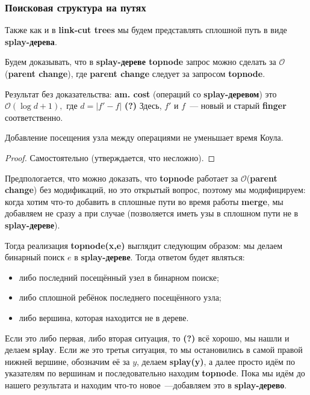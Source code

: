 \subsubsection{Поисковая структура на путях}
Также как и в \textbf{link-cut trees} мы будем представлять сплошной путь в виде \textbf{splay-дерева}.

Будем доказывать, что в \textbf{splay-дереве topnode} запрос можно сделать за $\mathcal{O}$(\textbf{parent change}), где \textbf{parent change} следует за запросом \textbf{topnode}.


Результат без доказательства: \textbf{am. cost} (операций со \textbf{splay-деревом}) это $\mathcal{O}(\log{d + 1}),$ где $d = |f' - f|$ \textbf{(?)} Здесь, $f'$ и $f$~--- новый и старый \textbf{finger} соответственно.
\begin{lemma}
Добавление посещения узла между операциями не уменьшает время Коула.
\end{lemma}
\begin{proof}
Самостоятельно (утверждается, что несложно).
\end{proof}

Предпологается, что можно доказать, что \textbf{topnode} работает за $\mathcal{O}$(\textbf{parent change}) без модификаций, но это открытый вопрос, поэтому мы модифицируем: когда хотим что-то добавить в сплошные пути во время работы \textbf{merge}, мы добавляем не сразу а при случае (позволяется иметь узы в сплошном пути не в \textbf{splay-дереве}).

Тогда реализация \textbf{topnode(x,e)} выглядит следующим образом: мы делаем бинарный поиск $e$ в \textbf{splay-дереве}. Тогда ответом будет являться:
\begin{itemize}
    \item либо последний посещённый узел в бинарном поиске;
    \item либо сплошной ребёнок последнего посещённого узла;
    \item либо вершина, которая находится не в дереве.
\end{itemize}
Если это либо первая, либо вторая ситуация, то \textbf{(?)} всё хорошо, мы нашли и делаем \textbf{splay}. Если же это третья ситуация, то мы остановились в самой правой нижней вершине, обозначим её за $y$, делаем \textbf{splay(y)}, а далее просто идём по указателям по вершинам и последовательно находим \textbf{topnode}. Пока мы идём до нашего результата и находим что-то новое~---добавляем это в \textbf{splay-дерево}.

